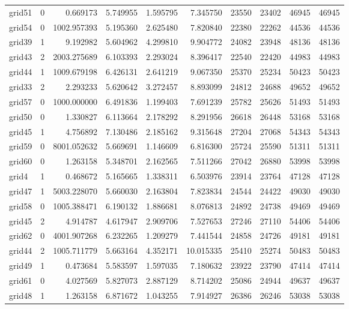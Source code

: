 \begin{longtable}{|l|r|r|r|r|r|r|r|r|r|}
grid51 & 0 & 0.669173 & 5.749955 & 1.595795 & 7.345750 & 23550 & 23402 & 46945 & 46945 \\
grid54 & 0 & 1002.957393 & 5.195360 & 2.625480 & 7.820840 & 22380 & 22262 & 44536 & 44536 \\
grid39 & 1 & 9.192982 & 5.604962 & 4.299810 & 9.904772 & 24082 & 23948 & 48136 & 48136 \\
grid43 & 2 & 2003.275689 & 6.103393 & 2.293024 & 8.396417 & 22540 & 22420 & 44983 & 44983 \\
grid44 & 1 & 1009.679198 & 6.426131 & 2.641219 & 9.067350 & 25370 & 25234 & 50423 & 50423 \\
grid33 & 2 & 2.293233 & 5.620642 & 3.272457 & 8.893099 & 24812 & 24688 & 49652 & 49652 \\
grid57 & 0 & 1000.000000 & 6.491836 & 1.199403 & 7.691239 & 25782 & 25626 & 51493 & 51493 \\
grid50 & 0 & 1.330827 & 6.113664 & 2.178292 & 8.291956 & 26618 & 26448 & 53168 & 53168 \\
grid45 & 1 & 4.756892 & 7.130486 & 2.185162 & 9.315648 & 27204 & 27068 & 54343 & 54343 \\
grid59 & 0 & 8001.052632 & 5.669691 & 1.146609 & 6.816300 & 25724 & 25590 & 51311 & 51311 \\
grid60 & 0 & 1.263158 & 5.348701 & 2.162565 & 7.511266 & 27042 & 26880 & 53998 & 53998 \\
grid4 & 1 & 0.468672 & 5.165665 & 1.338311 & 6.503976 & 23914 & 23764 & 47128 & 47128 \\
grid47 & 1 & 5003.228070 & 5.660030 & 2.163804 & 7.823834 & 24544 & 24422 & 49030 & 49030 \\
grid58 & 0 & 1005.388471 & 6.190132 & 1.886681 & 8.076813 & 24892 & 24738 & 49469 & 49469 \\
grid45 & 2 & 4.914787 & 4.617947 & 2.909706 & 7.527653 & 27246 & 27110 & 54406 & 54406 \\
grid62 & 0 & 4001.907268 & 6.232265 & 1.209279 & 7.441544 & 24858 & 24726 & 49181 & 49181 \\
grid44 & 2 & 1005.711779 & 5.663164 & 4.352171 & 10.015335 & 25410 & 25274 & 50483 & 50483 \\
grid49 & 1 & 0.473684 & 5.583597 & 1.597035 & 7.180632 & 23922 & 23790 & 47414 & 47414 \\
grid61 & 0 & 4.027569 & 5.827073 & 2.887129 & 8.714202 & 25086 & 24944 & 49637 & 49637 \\
grid48 & 1 & 1.263158 & 6.871672 & 1.043255 & 7.914927 & 26386 & 26246 & 53038 & 53038 \\

\end{longtable}
